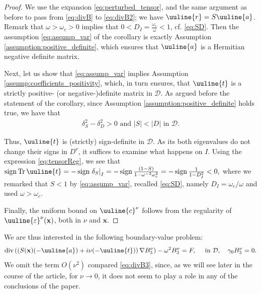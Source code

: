\documentclass[report]{elsarticle}
\numberwithin{theorem}{section}
\renewcommand{\vec}[1]{\mathbf{#1}}
\begin{document}
\begin{proof}
	We use the expansion \eqref{eq:perturbed_tensor}, and the same argument as before to pass from \eqref{eq:divB} to \eqref{eq:divB2}; we have $\uuline{r}=S\uuline{a}$. Remark that $\omega>\omega_c>0$ implies that $0<D_I=\frac{\omega_c}{\omega}<1$, cf. \eqref{eq:SD}. Then 
	 the assumption \eqref{eq:assump_var} of the corollary is exactly Assumption \ref{assumption:positive_definite}, which ensures that $\uuline{a}$ is a Hermitian negative definite matrix. 
	
	Next, let us show that \eqref{eq:assump_var} implies Assumption \ref{assump:coefficients_positivity}, which, in turn ensures, that $\uuline{t}$ is a strictly positive- (or negative-)definite matrix in $\mathcal{D}$. As argued before the statement of the corollary, since Assumption \ref{assumption:positive_definite} holds true, we have that 
	\begin{align*}
		\delta_S^2-\delta_D^2>0 \text{ and }|S|< |D| \text{ in }\mathcal{D}.
	\end{align*}

	
	
Thus, $\uuline{t}$ is (strictly) sign-definite in $\mathcal{D}$.  As its both eigenvalues do not change their signs in $D^{\nu}$, it suffices to examine what happens on $I$. Using the expression \eqref{eq:tensorReg}, we see that $\operatorname{sign}\operatorname{Tr}\uuline{t}=-\operatorname{sign}\left.\delta_S\right|_{I}=-\operatorname{sign}\frac{(1-S)}{1-\omega^{-2}\omega_c^2}=-\operatorname{sign}\frac{1}{1-D_I^2}<0,$ where we remarked that $S<1$ by \eqref{eq:assump_var}, recalled \eqref{eq:SD}, namely $D_I=\omega_c/\omega$ and used $\omega>\omega_c$.  


	Finally, the uniform bound on $\uuline{c}^{\nu}$ follows from the regularity of $\uuline{\varepsilon}^{\nu}(\vec{x})$, both in $\nu$ and $\vec{x}$. 
\end{proof}
We are thus interested in the following boundary-value problem: 
\begin{align*}
	\operatorname{div}\left(\left(S(\vec{x})(-\uuline{a})+i\nu(-\uuline{t})\right)\nabla B_3^{\nu}\right)-\omega^2 B_3^{\nu}=F, \quad \text{ in }\mathcal{D}, \quad \gamma_0 B_3^{\nu}=0.
\end{align*}
We omit the term $O(\nu^2)$ compared \eqref{eq:divB3}, since, as we will see later in the course of the article, for $\nu\rightarrow 0$, it does not seem to play a role in any of the conclusions of the paper. 
\end{document}
